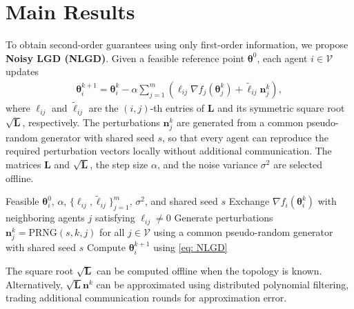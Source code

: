 \documentclass{siamart251216}
\begin{document}

\section{Main Results}
\label{sec: Main Results}
To obtain second-order guarantees using only first-order information, we propose \textbf{Noisy LGD (NLGD)}. Given a feasible reference point $\boldsymbol{\theta}^{0}$, each agent $i\in\mathcal{V}$ updates
\begin{gather}
    \label{eq: NLGD}
    \boldsymbol{\theta}_{i}^{k+1}=\boldsymbol{\theta}_{i}^{k}-\alpha\sum_{j=1}^{m}\left(\ell_{ij}\nabla f_j(\boldsymbol{\theta}_{j}^{k})+\tilde{\ell}_{ij}\mathbf{n}_{j}^{k}\right),
\end{gather}
where $\ell_{ij}$ and $\tilde{\ell}_{ij}$ are the $(i,j)$-th entries of $\mathbf{L}$ and its symmetric square root $\sqrt{\mathbf{L}}$, respectively. The perturbations $\mathbf{n}_{j}^{k}$ are generated from a common pseudo-random generator with shared seed $s$, so that every agent can reproduce the required perturbation vectors locally without additional communication. The matrices $\mathbf{L}$ and $\sqrt{\mathbf{L}}$, the step size $\alpha$, and the noise variance $\sigma^{2}$ are selected offline.

\begin{algorithm}[h]
    \caption{Noisy Laplacian Gradient Descent (NLGD)}
    \label{alg:NLGD}
    \begin{algorithmic}[1]
    \REQUIRE Feasible $\boldsymbol{\theta}_{i}^{0}$, $\alpha$, $\{\ell_{ij},\tilde{\ell}_{ij}\}_{j=1}^{m}$, $\sigma^{2}$, and shared seed $s$
            \STATE Exchange $\nabla f_i(\boldsymbol{\theta}_{i}^{k})$ with neighboring agents $j$ satisfying $\ell_{ij}\neq 0$
            \STATE Generate perturbations $\mathbf{n}_j^k = \mathrm{PRNG}(s,k,j)$ for all $j \in \mathcal{V}$ using a common pseudo-random generator with shared seed $s$
            \STATE Compute $\boldsymbol{\theta}_{i}^{k+1}$ using \eqref{eq: NLGD}
        \ENDFOR
    \ENDFOR
    \end{algorithmic}
\end{algorithm}

\begin{remark}
    The square root $\sqrt{\mathbf{L}}$ can be computed offline when the topology is known. Alternatively, $\sqrt{\mathbf{L}}\mathbf{n}^{k}$ can be approximated using distributed polynomial filtering, trading additional communication rounds for approximation error.
\end{remark}
\end{document}

